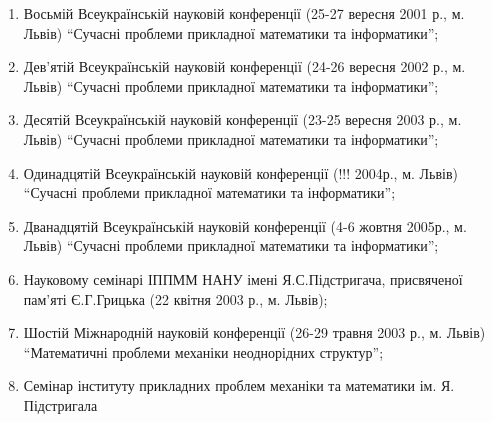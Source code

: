 \begin{enumerate}
\def\labelenumi{\arabic{enumi}.}
\item
  Восьмій Всеукраїнській науковій конференції (25-27 вересня 2001 р., м.
  Львів) ``Сучасні проблеми прикладної математики та інформатики'';
\item
  Дев'ятій Всеукраїнській науковій конференції (24-26 вересня 2002 р.,
  м. Львів) ``Сучасні проблеми прикладної математики та інформатики'';
\item
  Десятій Всеукраїнській науковій конференції (23-25 вересня 2003 р., м.
  Львів) ``Сучасні проблеми прикладної математики та інформатики'';
\item
  Одинадцятій Всеукраїнській науковій конференції (!!! 2004р., м. Львів)
  ``Сучасні проблеми прикладної математики та інформатики'';
\item
  Дванадцятій Всеукраїнській науковій конференції (4-6 жовтня 2005р., м.
  Львів) ``Сучасні проблеми прикладної математики та інформатики'';
\item
  Науковому семінарі ІППММ НАНУ імені Я.С.Підстригача, присвяченої
  пам'яті Є.Г.Грицька (22 квітня 2003 р., м. Львів);
\item
  Шостій Міжнародній науковій конференції (26-29 травня 2003 р., м.
  Львів) ``Математичні проблеми механіки неоднорідних структур'';
\item
  Семінар інституту прикладних проблем механіки та математики ім. Я.
  Підстригала
\end{enumerate}

